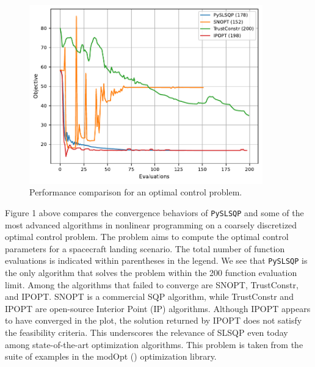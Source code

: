 \documentclass[
]{article}
\begin{document}
\begin{figure}
\centering
\includegraphics[width=0.9\textwidth,height=\textheight]{starship_20_jax-objective-cb.pdf}
\caption{Performance comparison for an optimal control problem.}
\end{figure}

Figure 1 above compares the convergence behaviors of \texttt{PySLSQP}
and some of the most advanced algorithms in nonlinear programming on a
coarsely discretized optimal control problem. The problem aims to
compute the optimal control parameters for a spacecraft landing
scenario. The total number of function evaluations is indicated within
parentheses in the legend. We see that \texttt{PySLSQP} is the only
algorithm that solves the problem within the 200 function evaluation
limit. Among the algorithms that failed to converge are SNOPT,
TrustConstr, and IPOPT. SNOPT is a commercial SQP algorithm, while
TrustConstr and IPOPT are open-source Interior Point (IP) algorithms.
Although IPOPT appears to have converged in the plot, the solution
returned by IPOPT does not satisfy the feasibility criteria. This
underscores the relevance of SLSQP even today among state-of-the-art
optimization algorithms. This problem is taken from the suite of
examples in the modOpt () optimization library.
\end{document}
